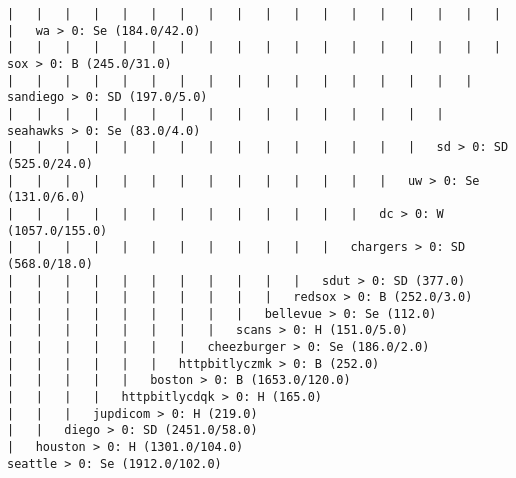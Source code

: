 \documentclass[a4paper]{article}
\begin{document}
\begin{landscape}
\begin{verbatim}
|   |   |   |   |   |   |   |   |   |   |   |   |   |   |   |   |   |   |   wa > 0: Se (184.0/42.0)
|   |   |   |   |   |   |   |   |   |   |   |   |   |   |   |   |   |   sox > 0: B (245.0/31.0)
|   |   |   |   |   |   |   |   |   |   |   |   |   |   |   |   |   sandiego > 0: SD (197.0/5.0)
|   |   |   |   |   |   |   |   |   |   |   |   |   |   |   |   seahawks > 0: Se (83.0/4.0)
|   |   |   |   |   |   |   |   |   |   |   |   |   |   |   sd > 0: SD (525.0/24.0)
|   |   |   |   |   |   |   |   |   |   |   |   |   |   uw > 0: Se (131.0/6.0)
|   |   |   |   |   |   |   |   |   |   |   |   |   dc > 0: W (1057.0/155.0)
|   |   |   |   |   |   |   |   |   |   |   |   chargers > 0: SD (568.0/18.0)
|   |   |   |   |   |   |   |   |   |   |   sdut > 0: SD (377.0)
|   |   |   |   |   |   |   |   |   |   redsox > 0: B (252.0/3.0)
|   |   |   |   |   |   |   |   |   bellevue > 0: Se (112.0)
|   |   |   |   |   |   |   |   scans > 0: H (151.0/5.0)
|   |   |   |   |   |   |   cheezburger > 0: Se (186.0/2.0)
|   |   |   |   |   |   httpbitlyczmk > 0: B (252.0)
|   |   |   |   |   boston > 0: B (1653.0/120.0)
|   |   |   |   httpbitlycdqk > 0: H (165.0)
|   |   |   jupdicom > 0: H (219.0)
|   |   diego > 0: SD (2451.0/58.0)
|   houston > 0: H (1301.0/104.0)
seattle > 0: Se (1912.0/102.0)
\end{verbatim}
\clearpage

\end{landscape}
\end{document}
